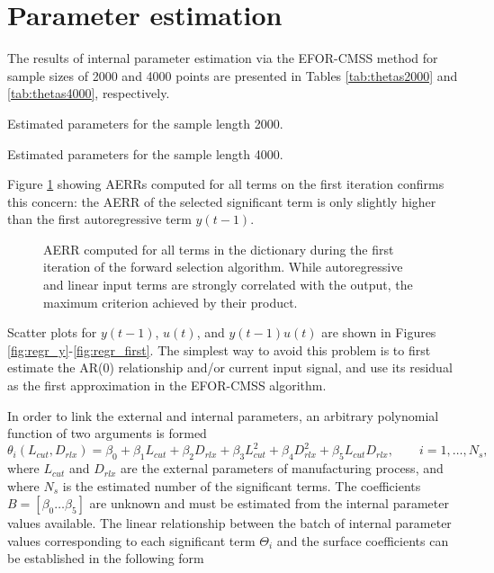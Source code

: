 \documentclass[a4paper,11pt,twoside]{article}
\theoremstyle{mytheoremstyle}
\begin{document}
\section{Parameter estimation}
\par The results of internal parameter estimation via the EFOR-CMSS method for sample sizes of 2000 and 4000 points are presented in Tables \ref{tab:thetas2000} and \ref{tab:thetas4000}, respectively.
\begin{table}[!h]
	\centering
	\caption{Estimated parameters for the sample length 2000.}\label{tab:thetas2000}
	\small
	
\end{table}
\begin{table}[!h]
	\centering
	\caption{Estimated parameters for the sample length 4000.}\label{tab:thetas4000}
	\small  
	
\end{table}
Figure \ref{fig:AERR} showing AERRs computed for all terms on the first iteration confirms this concern: the AERR of the selected significant term is only slightly higher than the first autoregressive term $y(t-1)$. 
\begin{figure}[!h]
	\centering
	
	\caption{AERR computed for all terms in the dictionary during the first iteration of the forward selection algorithm. While autoregressive and linear input terms are strongly correlated with the output, the maximum criterion achieved by their product.}\label{fig:AERR}
\end{figure}
Scatter plots for $y(t-1)$, $u(t)$, and $y(t-1)u(t)$ are shown in Figures \ref{fig:regr_y}-\ref{fig:regr_first}. The simplest way to avoid this problem is to first estimate the AR(0) relationship and/or current input signal, and use its residual as the first approximation in the EFOR-CMSS algorithm.
\par In order to link the external and internal parameters, an arbitrary polynomial function of two arguments is formed
\begin{equation}
\theta_i(L_{cut},D_{rlx}) = \beta_0 + \beta_1 L_{cut} + \beta_2 D_{rlx} + \beta_3 L_{cut}^{2} + \beta_4 D_{rlx}^{2} + \beta_5 L_{cut} D_{rlx}, \qquad i=1,\dots,N_s,
\end{equation}
where $L_{cut}$ and $D_{rlx}$ are the external parameters of manufacturing process, and where $N_s$ is the estimated number of the significant terms. The coefficients $B = \left[ \beta_0 \dots \beta_5 \right]$ are unknown and must be estimated from the internal parameter values available. The linear relationship between the batch of internal parameter values corresponding to each significant term $\Theta_i$ and the surface coefficients can be established in the following form
\end{document}
